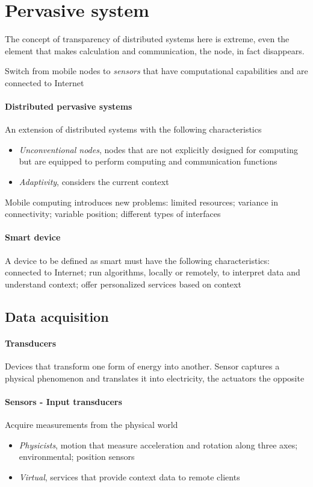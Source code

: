 \section{Pervasive system}
The concept of transparency of distributed systems here is extreme, even the element that makes calculation and communication, the node, in fact disappears.

Switch from mobile nodes to \textit{sensors} that have computational capabilities and are connected to Internet

\paragraph{Distributed pervasive systems}
An extension of distributed systems with the following characteristics
\begin{itemize}
    \item \textit{Unconventional nodes}, nodes that are not explicitly designed for computing but are equipped to perform computing and communication functions
    \item \textit{Adaptivity}, considers the current context
\end{itemize}
Mobile computing introduces new problems: limited resources; variance in connectivity; variable position; different types of interfaces

\paragraph{Smart device}
A device to be defined as smart must have the following characteristics: connected to Internet; run algorithms, locally or remotely, to interpret data and understand context; offer personalized services based on context

\subsection{Data acquisition}
\paragraph{Transducers}
Devices that transform one form of energy into another. Sensor captures a physical phenomenon and translates it into electricity, the actuators the opposite

\paragraph{Sensors - Input transducers}
Acquire measurements from the physical world
\begin{itemize}
    \item \textit{Physicists}, motion that measure acceleration and rotation along three axes; environmental; position sensors
    \item \textit{Virtual}, services that provide context data to remote clients
\end{itemize}

